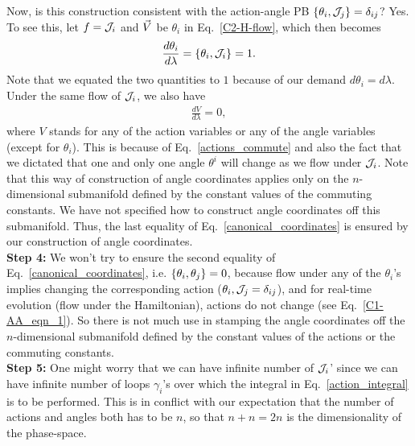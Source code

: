 Now, is this construction consistent with the action-angle 
PB $\left\lbrace \theta_i, \mathcal{J}_j \right\rbrace = \delta_{ij}$?
Yes. To see this, let $f = \mathcal{J}_i$ and $\vec{V}$ be $\theta_i$
 in Eq.~\eqref{C2-H-flow}, which then becomes
\begin{align}
\frac{d \theta_i  }{d \lambda}   = \left\lbrace   \theta_i ,  \mathcal{J}_i \right\rbrace  = 1  .  
\end{align}
Note that we equated the two quantities to $1$
because of our demand $d \theta_i = d \lambda$.
Under the same flow of $\mathcal{J}_i$, we also have 
\begin{align}
\frac{d V  }{d \lambda}   = 0  ,      
\end{align}
where $V$ stands for any of the action variables or any of the
angle variables (except for $\theta_i$). This is
because of Eq.~\eqref{actions_commute} and also the fact that
we dictated that
one and only one angle $\theta^i$ will change as we flow under $\mathcal{J}_i$.
Note that this way of construction of angle coordinates 
applies only on the $n$-dimensional submanifold defined by the constant
values of the commuting constants. We have not specified 
how to construct angle coordinates off this submanifold.
Thus, the last equality of Eq.~\eqref{canonical_coordinates} is ensured 
by our construction of angle coordinates.\\




\textbf{Step 4:} We won't try to ensure the second equality of 
Eq.~\eqref{canonical_coordinates}, i.e. 
$\left\lbrace  \theta_i, \theta_j \right\rbrace = 0$, because flow 
under any of the $\theta_i$'s
implies changing the corresponding action 
($\theta_i,  \mathcal{J}_j = \delta_{ij}$),
and for real-time evolution (flow under the Hamiltonian), actions 
do not change (see Eq.~\eqref{C1-AA_eqn_1}). So there is not much use
in stamping the angle coordinates off the 
$n$-dimensional submanifold defined by the constant values of the 
actions or the commuting constants.\\



 


\textbf{Step 5:} One might worry that we can have infinite number of 
$\mathcal{J}_i$' since we can have infinite number of loops $\gamma_i$'s
over which the integral in Eq.~\eqref{action_integral} is to be
performed. This is in conflict with our expectation that the number of 
actions and angles both has to be $n$, so that $n+n = 2n$ is the
dimensionality of the phase-space. 



